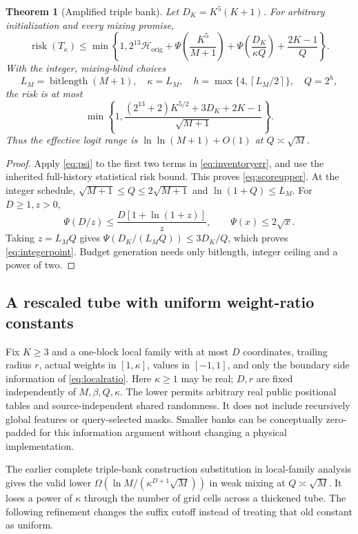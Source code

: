 \documentclass[11pt,letterpaper]{article}
\newtheorem{theorem}{Theorem}[section]
\theoremstyle{definition}\newtheorem{definition}[theorem]{Definition}
\theoremstyle{remark}\newtheorem{remark}[theorem]{Remark}
\newcommand{\ceil}[1]{\left\lceil #1\right\rceil}
\newcommand{\bl}{\operatorname{bitlength}}
\begin{document}
\begin{theorem}[Amplified triple bank]\label{thm:scoreupper}
Let $D_K=K^5(K+1)$. For arbitrary initialization and every mixing promise,
\begin{equation}\label{eq:scoreupper}
 \operatorname{risk}(T_\kappa)\le\min\left\{1,
 2^{13}\mathcal H_{\mathrm{orig}}+\Psi\left(\frac{K^5}{M+1}\right)
 +\Psi\left(\frac{D_K}{\kappa Q}\right)+\frac{2K-1}{Q}\right\}.
\end{equation}
With the integer, mixing-blind choices
\[
 L_M=\bl(M+1),\quad \kappa=L_M,\quad
 h=\max\{4,\ceil{L_M/2}\},\quad Q=2^h,
\]
the risk is at most
\begin{equation}\label{eq:integerpoint}
 \min\left\{1,\frac{(2^{13}+2)K^{5/2}+3D_K+2K-1}{\sqrt{M+1}}\right\}.
\end{equation}
Thus the effective logit range is $\ln\ln(M+1)+O(1)$ at $Q\asymp\sqrt M$.
\end{theorem}
\begin{proof}
Apply \eqref{eq:psi} to the first two terms in \eqref{eq:inventoryerr}, and use the inherited full-history statistical risk bound. This proves \eqref{eq:scoreupper}. At the integer schedule, $\sqrt{M+1}\le Q\le2\sqrt{M+1}$ and $\ln(1+Q)\le L_M$. For $D\ge1,z>0$,
\[
 \Psi(D/z)\le\frac{D[1+\ln(1+z)]}{z},\qquad \Psi(x)\le2\sqrt x.
\]
Taking $z=L_MQ$ gives $\Psi(D_K/(L_MQ))\le3D_K/Q$, which proves \eqref{eq:integerpoint}. Budget generation needs only bitlength, integer ceiling and a power of two.
\end{proof}

\subsection{A rescaled tube with uniform weight-ratio constants}
Fix $K\ge3$ and a one-block local family with at most $D$ coordinates, trailing radius $r$, actual weights in $[1,\kappa]$, values in $[-1,1]$, and only the boundary side information of \eqref{eq:localratio}. Here $\kappa\ge1$ may be real; $D,r$ are fixed independently of $M,\beta,Q,\kappa$. The lower permits arbitrary real public positional tables and source-independent shared randomness. It does not include recursively global features or query-selected masks. Smaller banks can be conceptually zero-padded for this information argument without changing a physical implementation.

The earlier complete triple-bank construction substitution in local-family analysis gives the valid lower $\Omega(\ln M/(\kappa^{D+1}\sqrt M))$ in weak mixing at $Q\asymp\sqrt M$. It loses a power of $\kappa$ through the number of grid cells across a thickened tube. The following refinement changes the suffix cutoff instead of treating that old constant as uniform.
\end{document}
